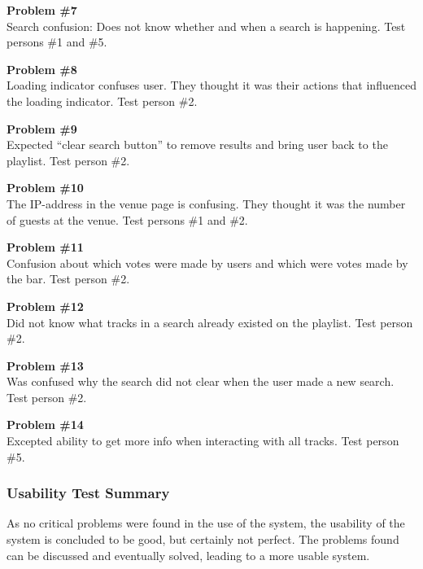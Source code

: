 \noindent\textbf{Problem \#7}\\
    Search confusion: Does not know whether and when a search is
    happening. Test persons \#1 and \#5.

\noindent\textbf{Problem \#8}\\
    Loading indicator confuses user. They thought it was their actions
    that influenced the loading indicator. Test person \#2.

\noindent\textbf{Problem \#9}\\
    Expected “clear search button” to remove results and bring user
    back to the playlist. Test person \#2.

\noindent\textbf{Problem \#10}\\
    The IP-address in the venue page is confusing. They thought it was
    the number of guests at the venue. Test persons \#1 and \#2.

\noindent\textbf{Problem \#11}\\
    Confusion about which votes were made by users and which were
    votes made by the bar. Test person \#2.

\noindent\textbf{Problem \#12}\\
    Did not know what tracks in a search already existed on the
    playlist. Test person \#2.

\noindent\textbf{Problem \#13}\\
    Was confused why the search did not clear when the user made a new
    search. Test person \#2.

\noindent\textbf{Problem \#14}\\
    Excepted ability to get more info when interacting with all
    tracks. Test person \#5.

\subsubsection{Usability Test Summary}

As no critical problems were found in the use of the system, the
usability of the system is concluded to be good, but certainly not
perfect. The problems found can be discussed and eventually
solved, leading to a more usable system.
